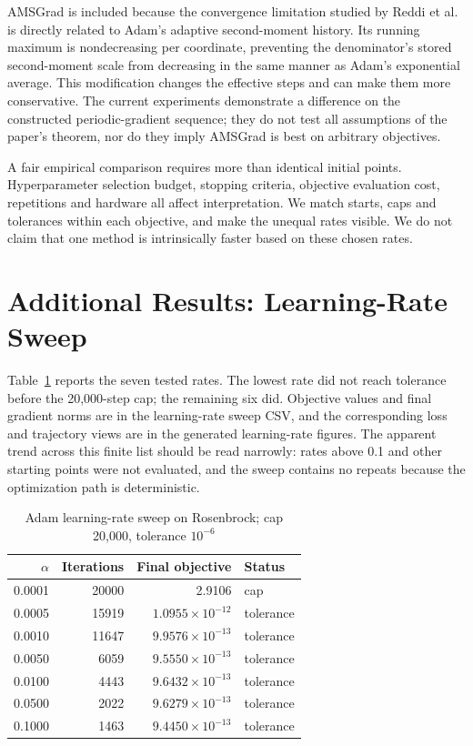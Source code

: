 \documentclass[conference]{IEEEtran}
\begin{document}
AMSGrad is included because the convergence limitation studied by Reddi et al. is directly related to Adam's adaptive second-moment history. Its running maximum is nondecreasing per coordinate, preventing the denominator's stored second-moment scale from decreasing in the same manner as Adam's exponential average. This modification changes the effective steps and can make them more conservative. The current experiments demonstrate a difference on the constructed periodic-gradient sequence; they do not test all assumptions of the paper's theorem, nor do they imply AMSGrad is best on arbitrary objectives.

A fair empirical comparison requires more than identical initial points. Hyperparameter selection budget, stopping criteria, objective evaluation cost, repetitions and hardware all affect interpretation. We match starts, caps and tolerances within each objective, and make the unequal rates visible. We do not claim that one method is intrinsically faster based on these chosen rates.
\section{Additional Results: Learning-Rate Sweep}
Table~\ref{tab:lr} reports the seven tested rates. The lowest rate did not reach tolerance before the 20,000-step cap; the remaining six did. Objective values and final gradient norms are in the learning-rate sweep CSV, and the corresponding loss and trajectory views are in the generated learning-rate figures. The apparent trend across this finite list should be read narrowly: rates above 0.1 and other starting points were not evaluated, and the sweep contains no repeats because the optimization path is deterministic.
\begin{table}[t]
\caption{Adam learning-rate sweep on Rosenbrock; cap 20,000, tolerance $10^{-6}$}
\label{tab:lr}
\centering
\begin{tabular}{rrrl}
\toprule
$\alpha$ & Iterations & Final objective & Status\\
\midrule
0.0001 & 20000 & 2.9106 & cap\\
0.0005 & 15919 & $1.0955\times10^{-12}$ & tolerance\\
0.0010 & 11647 & $9.9576\times10^{-13}$ & tolerance\\
0.0050 & 6059 & $9.5550\times10^{-13}$ & tolerance\\
0.0100 & 4443 & $9.6432\times10^{-13}$ & tolerance\\
0.0500 & 2022 & $9.6279\times10^{-13}$ & tolerance\\
0.1000 & 1463 & $9.4450\times10^{-13}$ & tolerance\\
\bottomrule
\end{tabular}
\end{table}
\end{document}
